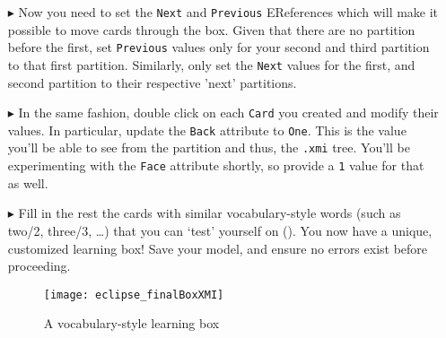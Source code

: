 \begin{itemize}
\item[$\blacktriangleright$] Now you need to set the \texttt{Next} and \texttt{Previous} EReferences which will make it possible to move cards through the
box. Given that there are no partition before the first, set \texttt{Previous} values only for your second and third partition to that first partition.
Similarly, only set the \texttt{Next} values for the first, and second partition to their respective 'next' partitions.

\item[$\blacktriangleright$] In the same fashion, double click on each \texttt{Card} you created and modify their values. In particular, update the
\texttt{Back} attribute to \texttt{One}. This is the value you'll be able to see from the partition and thus, the \texttt{.xmi} tree. You'll be experimenting
with the \texttt{Face} attribute shortly, so provide a \texttt{1} value for that as well.

\item[$\blacktriangleright$] Fill in the rest the cards with similar vocabulary-style words (such as two/2, three/3, \ldots) that you can `test' yourself on
(). You now have a unique, customized learning box! Save your model, and ensure no errors exist before proceeding.

\begin{figure}[htbp]
	\centering
  \texttt{[image: eclipse\_finalBoxXMI]}
	\caption{A vocabulary-style learning box}
	\label{eclipse:finalXMI}
\end{figure}

\end{itemize}
